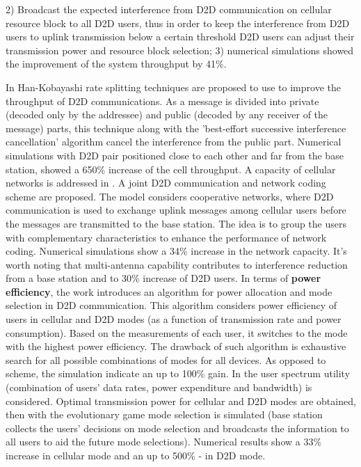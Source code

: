2) Broadcast the expected interference from D2D communication on cellular resource block to all D2D users, thus in order to keep the interference from D2D users to uplink transmission below a certain threshold D2D users can adjust their transmission power and resource block selection; 
3) numerical simulations showed the improvement of the system throughput by 41\%.
    \par In \cite {ratesplitting} Han-Kobayashi rate splitting techniques are proposed to use to improve the throughput of D2D communications. 
As a message is divided into private (decoded only by the addressee) and public (decoded by any receiver of the message) parts, this technique along with the 'best-effort successive interference cancellation' algorithm cancel the interference from the public part. 
Numerical simulations with D2D pair positioned close to each other and far from the base station, showed a 650\% increase of the cell throughput. 
A capacity of cellular networks is addressed in \cite {doppler}. 
A joint D2D communication and network coding scheme are proposed. 
The model considers cooperative networks, where D2D communication is used to exchange uplink messages among cellular users before the messages are transmitted to the base station. 
The idea is to group the users with complementary characteristics to enhance the performance of network coding. 
Numerical simulations show a 34\% increase in the network capacity. It's worth noting that multi-antenna capability contributes to interference reduction from a base station and to 30\% increase of D2D users. 
In terms of {\bf power efficiency}, the work \cite {choi} introduces an algorithm for power allocation and mode selection in D2D communication. 
This algorithm considers power efficiency of users in cellular and D2D modes (as a function of transmission rate and power consumption). 
Based on the measurements of each user, it switches to the mode with the highest power efficiency. 
The drawback of such algorithm is exhaustive search for all possible combinations of modes for all devices. 
As opposed to \cite {kosketa} scheme, the simulation indicate an up to 100\% gain.
In \cite {cognitive} the user spectrum utility (combination of users' data rates, power expenditure and bandwidth) is considered. 
Optimal transmission power for cellular and D2D modes are obtained, then with the evolutionary game mode selection is simulated (base station collects the users' decisions on mode selection and broadcasts the information to all users to aid the future mode selections). 
Numerical results show a 33\% increase in cellular mode and an up to 500\% - in D2D mode. 
